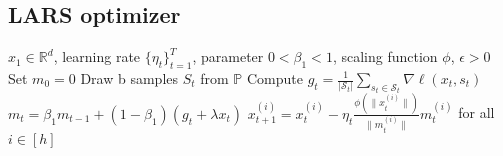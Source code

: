\subsection*{LARS optimizer}

\begin{minipage}[b]{.48\textwidth}
\begin{algorithm}[H]\small
	\caption{$LARS$}
	\label{alg:lars}
	\begin{algorithmic}
		 $x_1 \in \mathbb{R}^d$, learning rate $\{\eta_t\}_{t=1}^T$, parameter $0 < \beta_{1} < 1$, scaling function $\phi$, $\epsilon > 0$
		\STATE Set $m_{0} = 0$
		\STATE Draw b samples $S_t$ from $\mathbb{P}$
        \STATE Compute $g_t = \frac{1}{|\mathcal{S}_t|} \sum_{s_t \in \mathcal{S}_t}\nabla \ell(x_t, s_t)$
        \STATE $m_{t} = \beta_{1} m_{t-1} + (1 - \beta_{1}) (g_{t} + \lambda x_t)$
		\STATE $x_{t+1}^{(i)} = x_{t}^{(i)} - \eta_t \frac{\phi(\|x_t^{(i)}\|)}{\|m_t^{(i)}\|} m_t^{(i)}$ for all $i \in [h]$
		\ENDFOR
	\end{algorithmic}
\end{algorithm}
\end{minipage}\hfill%


